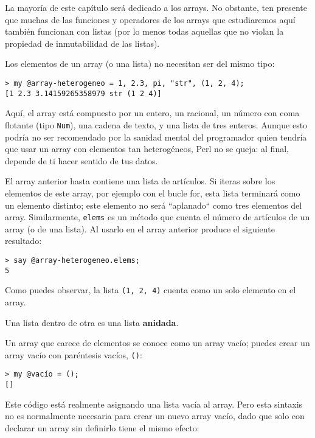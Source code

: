 La mayoría de este capítulo será dedicado a los arrays. No obstante,
ten presente que muchas de las funciones y operadores de los arrays
que estudiaremos aquí también funcionan con listas (por lo menos
todas aquellas que no violan la propiedad de inmutabilidad de las
listas). 

Los elementos de un array (o una lista) no necesitan ser del mismo
tipo:

\begin{verbatim}
> my @array-heterogeneo = 1, 2.3, pi, "str", (1, 2, 4);
[1 2.3 3.14159265358979 str (1 2 4)]
\end{verbatim}

Aquí, el array está compuesto por un entero, 
un racional, un número con coma flotante (tipo {\tt Num}),
una cadena de texto, y  una lista de tres enteros.
Aunque esto podría no ser recomendado por la sanidad mental
del programador quien tendría que usar un array con elementos
tan heterogéneos, Perl no se queja: al final, depende de ti hacer 
sentido de tus datos.

El array anterior hasta contiene una lista de artículos. 
Si iteras sobre los elementos de este array, por ejemplo con
el bucle for, esta lista terminará como un elemento distinto;
este elemento no será ``aplanado`` como tres elementos del
array. Similarmente, {\tt elems} es un método que cuenta el
número de artículos de un array (o de una lista). Al usarlo
en el array anterior produce el siguiente resultado:

\begin{verbatim}
> say @array-heterogeneo.elems;
5
\end{verbatim}
%

Como puedes observar, la lista \verb|(1, 2, 4)| cuenta como
un solo elemento en el array.

Una lista dentro de otra es una lista {\bf anidada}.

Un array que carece de elementos se conoce
como un array vacío; puedes crear un array vacío con
paréntesis vacíos, \verb|()|:

\begin{verbatim}
> my @vacío = ();
[]
\end{verbatim}

Este código está realmente asignando una lista vacía al array.
Pero esta sintaxis no es normalmente necesaria para crear un
nuevo array vacío, dado que solo con declarar un array sin 
definirlo tiene el mismo efecto:

